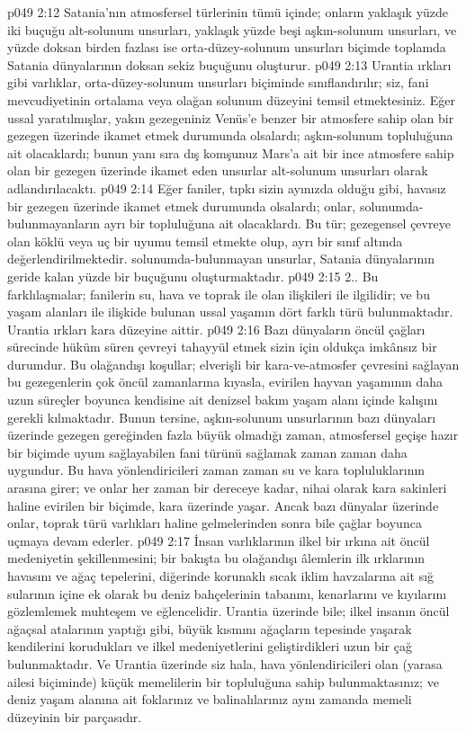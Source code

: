 \vs p049 2:12 Satania’nın atmosfersel türlerinin tümü içinde; onların yaklaşık yüzde iki buçuğu alt\hyp{}solunum unsurları, yaklaşık yüzde beşi aşkın\hyp{}solunum unsurları, ve yüzde doksan birden fazlası ise orta\hyp{}düzey\hyp{}solunum unsurları biçimde toplamda Satania dünyalarının doksan sekiz buçuğunu oluşturur.
\vs p049 2:13 Urantia ırkları gibi varlıklar, orta\hyp{}düzey\hyp{}solunum unsurları biçiminde sınıflandırılır; siz, fani mevcudiyetinin ortalama veya olağan solunum düzeyini temsil etmektesiniz. Eğer ussal yaratılmışlar, yakın gezegeniniz Venüs’e benzer bir atmosfere sahip olan bir gezegen üzerinde ikamet etmek durumunda olsalardı; aşkın\hyp{}solunum topluluğuna ait olacaklardı; bunun yanı sıra dış komşunuz Mars’a ait bir ince atmosfere sahip olan bir gezegen üzerinde ikamet eden unsurlar alt\hyp{}solunum unsurları olarak adlandırılacaktı.
\vs p049 2:14 Eğer faniler, tıpkı sizin ayınızda olduğu gibi, havasız bir gezegen üzerinde ikamet etmek durumunda olsalardı; onlar, solunumda\hyp{}bulunmayanların ayrı bir topluluğuna ait olacaklardı. Bu tür; gezegensel çevreye olan köklü veya uç bir uyumu temsil etmekte olup, ayrı bir sınıf altında değerlendirilmektedir. solunumda\hyp{}bulunmayan unsurlar, Satania dünyalarının geride kalan yüzde bir buçuğunu oluşturmaktadır.
\vs p049 2:15 2.\bibnobreakspace {}. Bu farklılaşmalar; fanilerin su, hava ve toprak ile olan ilişkileri ile ilgilidir; ve bu yaşam alanları ile ilişkide bulunan ussal yaşamın dört farklı türü bulunmaktadır. Urantia ırkları kara düzeyine aittir.
\vs p049 2:16 Bazı dünyaların öncül çağları sürecinde hüküm süren çevreyi tahayyül etmek sizin için oldukça imkânsız bir durumdur. Bu olağandışı koşullar; elverişli bir kara\hyp{}ve\hyp{}atmosfer çevresini sağlayan bu gezegenlerin çok öncül zamanlarına kıyasla, evirilen hayvan yaşamının daha uzun süreçler boyunca kendisine ait denizsel bakım yaşam alanı içinde kalışını gerekli kılmaktadır. Bunun tersine, aşkın\hyp{}solunum unsurlarının bazı dünyaları üzerinde gezegen gereğinden fazla büyük olmadığı zaman, atmosfersel geçişe hazır bir biçimde uyum sağlayabilen fani türünü sağlamak zaman zaman daha uygundur. Bu hava yönlendiricileri zaman zaman su ve kara topluluklarının arasına girer; ve onlar her zaman bir dereceye kadar, nihai olarak kara sakinleri haline evirilen bir biçimde, kara üzerinde yaşar. Ancak bazı dünyalar üzerinde onlar, toprak türü varlıkları haline gelmelerinden sonra bile çağlar boyunca uçmaya devam ederler.
\vs p049 2:17 İnsan varlıklarının ilkel bir ırkına ait öncül medeniyetin şekillenmesini; bir bakışta bu olağandışı âlemlerin ilk ırklarının havasını ve ağaç tepelerini, diğerinde korunaklı sıcak iklim havzalarına ait sığ sularının içine ek olarak bu deniz bahçelerinin tabanını, kenarlarını ve kıyılarını gözlemlemek muhteşem ve eğlencelidir. Urantia üzerinde bile; ilkel insanın öncül ağaçsal atalarının yaptığı gibi, büyük kısmını ağaçların tepesinde yaşarak kendilerini korudukları ve ilkel medeniyetlerini geliştirdikleri uzun bir çağ bulunmaktadır. Ve Urantia üzerinde siz hala, hava yönlendiricileri olan (yarasa ailesi biçiminde) küçük memelilerin bir topluluğuna sahip bulunmaktasınız; ve deniz yaşam alanına ait foklarınız ve balinalılarınız aynı zamanda memeli düzeyinin bir parçasıdır.
